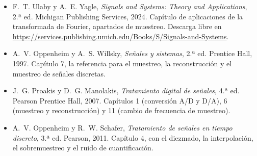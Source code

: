 \documentclass[11pt,a4paper]{scrartcl}
\begin{document}
\begin{itemize}
  \item F.~T. Ulaby y A.~E. Yagle, \emph{Signals and Systems: Theory and Applications}, 2.ª ed. Michigan Publishing Services, 2024. Capítulo de aplicaciones de la transformada de Fourier, apartados de muestreo. Descarga libre en\\ \url{https://services.publishing.umich.edu/Books/S/Signals-and-Systems}.
  \item A.~V. Oppenheim y A.~S. Willsky, \emph{Señales y sistemas}, 2.ª ed. Prentice Hall, 1997. Capítulo 7, la referencia para el muestreo, la reconstrucción y el muestreo de señales discretas.
  \item J.~G. Proakis y D.~G. Manolakis, \emph{Tratamiento digital de señales}, 4.ª ed. Pearson Prentice Hall, 2007. Capítulos 1 (conversión A/D y D/A), 6 (muestreo y reconstrucción) y 11 (cambio de frecuencia de muestreo).
  \item A.~V. Oppenheim y R.~W. Schafer, \emph{Tratamiento de señales en tiempo discreto}, 3.ª ed. Pearson, 2011. Capítulo 4, con el diezmado, la interpolación, el sobremuestreo y el ruido de cuantificación.
\end{itemize}
\end{document}
